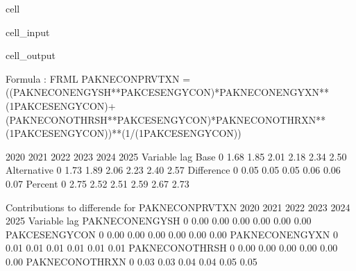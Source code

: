 \documentclass[letterpaper,10pt,english]{jupyterBook}
\begin{document}
\begin{sphinxuseclass}{cell}\begin{sphinxVerbatimInput}

\begin{sphinxuseclass}{cell_input}
\begin{sphinxVerbatim}[commandchars=\\\{\}]
 
    \PYG{p}{[}\PYG{p}{]}
\end{sphinxVerbatim}

\end{sphinxuseclass}\end{sphinxVerbatimInput}
\begin{sphinxVerbatimOutput}

\begin{sphinxuseclass}{cell_output}
\begin{sphinxVerbatim}[commandchars=\\\{\}]
Formula        : FRML  \PYGZlt{}\PYGZgt{} PAKNECONPRVTXN = ((PAKNECONENGYSH**PAKCESENGYCON)*PAKNECONENGYXN**(1\PYGZhy{}PAKCESENGYCON)+(PAKNECONOTHRSH**PAKCESENGYCON)*PAKNECONOTHRXN**(1\PYGZhy{}PAKCESENGYCON))**(1/(1\PYGZhy{}PAKCESENGYCON)) \PYGZdl{} 

                      2020       2021       2022       2023       2024       2025
Variable    lag                                                                  
Base        0         1.68       1.85       2.01       2.18       2.34       2.50
Alternative 0         1.73       1.89       2.06       2.23       2.40       2.57
Difference  0         0.05       0.05       0.05       0.06       0.06       0.07
Percent     0         2.75       2.52       2.51       2.59       2.67       2.73

 Contributions to differende for  PAKNECONPRVTXN
                         2020       2021       2022       2023       2024       2025
Variable       lag                                                                  
PAKNECONENGYSH 0         0.00       0.00       0.00       0.00       0.00       0.00
PAKCESENGYCON  0         0.00       0.00       0.00       0.00       0.00       0.00
PAKNECONENGYXN 0         0.01       0.01       0.01       0.01       0.01       0.01
PAKNECONOTHRSH 0         0.00       0.00       0.00       0.00       0.00       0.00
PAKNECONOTHRXN 0         0.03       0.03       0.04       0.04       0.05       0.05


\end{sphinxVerbatim}
\end{sphinxuseclass}
\end{sphinxVerbatimOutput}
\end{sphinxuseclass}
\end{document}
